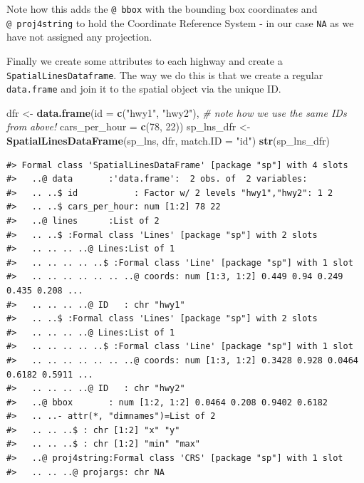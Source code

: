 \documentclass[]{book}
\newenvironment{Shaded}{\begin{snugshade}}{\end{snugshade}}
\newcommand{\KeywordTok}[1]{\textcolor[rgb]{0.13,0.29,0.53}{\textbf{#1}}}
\newcommand{\DataTypeTok}[1]{\textcolor[rgb]{0.13,0.29,0.53}{#1}}
\newcommand{\DecValTok}[1]{\textcolor[rgb]{0.00,0.00,0.81}{#1}}
\newcommand{\StringTok}[1]{\textcolor[rgb]{0.31,0.60,0.02}{#1}}
\newcommand{\CommentTok}[1]{\textcolor[rgb]{0.56,0.35,0.01}{\textit{#1}}}
\newcommand{\NormalTok}[1]{#1}
\begin{document}
Note how this adds the \texttt{@\ bbox} with the bounding box
coordinates and \texttt{@\ proj4string} to hold the Coordinate Reference
System - in our case \texttt{NA} as we have not assigned any projection.

Finally we create some attributes to each highway and create a
\texttt{SpatialLinesDataframe}. The way we do this is that we create a
regular \texttt{data.frame} and join it to the spatial object via the
unique ID.

\begin{Shaded}
\begin{Highlighting}[]
\NormalTok{dfr <-}\StringTok{ }\KeywordTok{data.frame}\NormalTok{(}\DataTypeTok{id =} \KeywordTok{c}\NormalTok{(}\StringTok{"hwy1"}\NormalTok{, }\StringTok{"hwy2"}\NormalTok{), }\CommentTok{# note how we use the same IDs from above!}
                  \DataTypeTok{cars_per_hour =} \KeywordTok{c}\NormalTok{(}\DecValTok{78}\NormalTok{, }\DecValTok{22}\NormalTok{)) }
\NormalTok{sp_lns_dfr <-}\StringTok{ }\KeywordTok{SpatialLinesDataFrame}\NormalTok{(sp_lns, dfr, }\DataTypeTok{match.ID =} \StringTok{"id"}\NormalTok{)}
\KeywordTok{str}\NormalTok{(sp_lns_dfr)}
\end{Highlighting}
\end{Shaded}

\begin{verbatim}
#> Formal class 'SpatialLinesDataFrame' [package "sp"] with 4 slots
#>   ..@ data       :'data.frame':  2 obs. of  2 variables:
#>   .. ..$ id           : Factor w/ 2 levels "hwy1","hwy2": 1 2
#>   .. ..$ cars_per_hour: num [1:2] 78 22
#>   ..@ lines      :List of 2
#>   .. ..$ :Formal class 'Lines' [package "sp"] with 2 slots
#>   .. .. .. ..@ Lines:List of 1
#>   .. .. .. .. ..$ :Formal class 'Line' [package "sp"] with 1 slot
#>   .. .. .. .. .. .. ..@ coords: num [1:3, 1:2] 0.449 0.94 0.249 0.435 0.208 ...
#>   .. .. .. ..@ ID   : chr "hwy1"
#>   .. ..$ :Formal class 'Lines' [package "sp"] with 2 slots
#>   .. .. .. ..@ Lines:List of 1
#>   .. .. .. .. ..$ :Formal class 'Line' [package "sp"] with 1 slot
#>   .. .. .. .. .. .. ..@ coords: num [1:3, 1:2] 0.3428 0.928 0.0464 0.6182 0.5911 ...
#>   .. .. .. ..@ ID   : chr "hwy2"
#>   ..@ bbox       : num [1:2, 1:2] 0.0464 0.208 0.9402 0.6182
#>   .. ..- attr(*, "dimnames")=List of 2
#>   .. .. ..$ : chr [1:2] "x" "y"
#>   .. .. ..$ : chr [1:2] "min" "max"
#>   ..@ proj4string:Formal class 'CRS' [package "sp"] with 1 slot
#>   .. .. ..@ projargs: chr NA
\end{verbatim}
\end{document}
